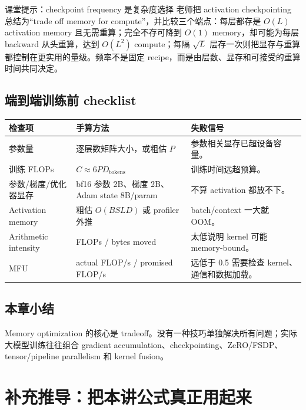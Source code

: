\documentclass[a4paper]{article}
\begin{document}
\begin{knowledgebox}{课堂提示：checkpoint frequency 是复杂度选择}
老师把 activation checkpointing 总结为“trade off memory for compute”，并比较三个端点：每层都存是 \(O(L)\) activation memory 且无需重算；完全不存可降到 \(O(1)\) memory，却可能为每层 backward 从头重算，达到 \(O(L^2)\) compute；每隔 \(\sqrt L\) 层存一次则把显存与重算都控制在更实用的量级。频率不是固定 recipe，而是由层数、显存和可接受的重算时间共同决定。
\end{knowledgebox}

\subsection{端到端训练前 checklist}

\begin{longtable}{p{}p{}p{}}
\toprule
\textbf{检查项} & \textbf{手算方法} & \textbf{失败信号} \\
\midrule
参数量 & 逐层数矩阵大小，或粗估 \(P\) & 参数相关显存已超设备容量。 \\
训练 FLOPs & \(C\approx 6P D_{\text{tokens}}\) & 训练时间远超预算。 \\
参数/梯度/优化器显存 & bf16 参数 2B、梯度 2B、Adam state 8B/param & 不算 activation 都放不下。 \\
Activation memory & 粗估 \(O(BSLD)\) 或 profiler 外推 & batch/context 一大就 OOM。 \\
Arithmetic intensity & FLOPs / bytes moved & 太低说明 kernel 可能 memory-bound。 \\
MFU & actual FLOP/s / promised FLOP/s & 远低于 0.5 需要检查 kernel、通信和数据加载。 \\
\bottomrule
\end{longtable}

\subsection{本章小结}

Memory optimization 的核心是 tradeoff。没有一种技巧单独解决所有问题；实际大模型训练往往组合 gradient accumulation、checkpointing、ZeRO/FSDP、tensor/pipeline parallelism 和 kernel fusion。



\section{补充推导：把本讲公式真正用起来}
\end{document}
